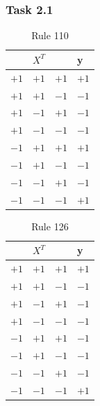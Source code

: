 \documentclass[10pt,aspectratio=169,handout]{beamer}
\begin{document}
\begin{frame}
    \frametitle{Task 2.1}
    \begin{minipage}{0.45\textwidth}
        \begin{table}[]
            \caption[short]{Rule 110}
            \begin{tabular}{llll}
                \hline
                     & $X^T$ &      & y    \\ \hline
                $+1$ & $+1$  & $+1$ & $+1$ \\
                $+1$ & $+1$  & $-1$ & $-1$ \\
                $+1$ & $-1$  & $+1$ & $-1$ \\
                $+1$ & $-1$  & $-1$ & $-1$ \\
                $-1$ & $+1$  & $+1$ & $+1$ \\
                $-1$ & $+1$  & $-1$ & $-1$ \\
                $-1$ & $-1$  & $+1$ & $-1$ \\
                $-1$ & $-1$  & $-1$ & $+1$ \\ \hline
            \end{tabular}
        \end{table}
    \end{minipage}
    \begin{minipage}{0.45\textwidth}
        \begin{table}[]
            \caption[short]{Rule 126}
            \begin{tabular}{llll}
                \hline
                     & $X^T$ &      & y    \\ \hline
                $+1$ & $+1$  & $+1$ & $+1$ \\
                $+1$ & $+1$  & $-1$ & $-1$ \\
                $+1$ & $-1$  & $+1$ & $-1$ \\
                $+1$ & $-1$  & $-1$ & $-1$ \\
                $-1$ & $+1$  & $+1$ & $-1$ \\
                $-1$ & $+1$  & $-1$ & $-1$ \\
                $-1$ & $-1$  & $+1$ & $-1$ \\
                $-1$ & $-1$  & $-1$ & $+1$ \\ \hline
            \end{tabular}
        \end{table}
    \end{minipage}
\end{frame}
\end{document}
